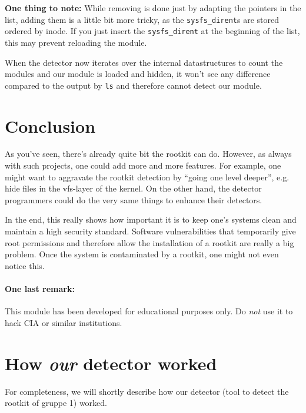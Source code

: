 \documentclass[10pt, letterpaper]{scrartcl}
\begin{document}
\textbf{One thing to note:} While removing is done just by adapting the pointers in the list, adding them is a little bit more tricky, as 
the \texttt{sysfs\_dirent}s are stored ordered by inode. If you just insert the \texttt{sysfs\_dirent} at the beginning of the list, this may prevent reloading the module.

When the detector now iterates over the internal datastructures to count the modules and our module is loaded and hidden, it won't see any difference compared to the output by \texttt{ls} and therefore cannot detect our module.

\section{Conclusion}

As you've seen, there's already quite bit the rootkit can do. However, as always with such projects, one could add more and more features. For example, one might want to aggravate the rootkit detection by ``going one level deeper'', e.g. hide files in the vfs-layer of the kernel. On the other hand, the detector programmers could do the very same things to enhance their detectors.

In the end, this really shows how important it is to keep one's systems clean and maintain a high security standard. Software vulnerabilities that temporarily give root permissions and therefore allow the installation of a rootkit are really a big problem. Once the system is contaminated by a rootkit, one might not even notice this.

\paragraph{One last remark:}This module has been developed for educational purposes only. Do \textit{not} use it to hack CIA or similar institutions.

\appendix{}

\section{How \emph{our} detector worked}
\label{sec:our-detector}

For completeness, we will shortly describe how our detector (tool to detect the rootkit of gruppe 1) worked.
\end{document}
